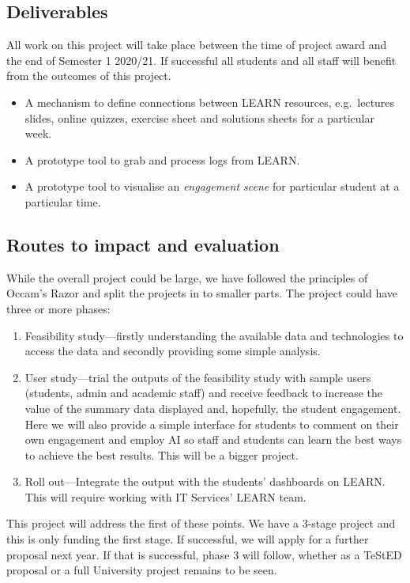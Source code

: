 \documentclass[11pt]{lucs-art}
\newcommand{\tested}{TeStED\xspace}
\begin{document}
\subsection{Deliverables}
All work on this project will take place between the time of project
award and the end of Semester 1 2020/21.  If successful all students
and all staff will benefit from the outcomes of this project.
\begin{itemize}
\item A mechanism to define connections between LEARN resources,
  e.g.\ lectures slides, online quizzes, exercise sheet and solutions
  sheets for a particular week.
\item A prototype tool to grab and process logs from LEARN.
\item A prototype tool to visualise an \emph{engagement scene} for
  particular student at a particular time.
\end{itemize}

\subsection{Routes to impact and evaluation}

While the overall project could be large, we have followed the
principles of Occam's Razor and split the projects in to smaller
parts.  The project could have three or more phases:
\begin{enumerate}
\item Feasibility study---firstly understanding the available data and
  technologies to access the data and secondly providing some simple
  analysis.
\item User study---trial the outputs of the feasibility study with
  sample users (students, admin and academic staff) and receive
  feedback to increase the value of the summary data displayed and,
  hopefully, the student engagement.  Here we will also provide a
  simple interface for students to comment on their own engagement
  and employ AI so staff and students can learn the best ways to
  achieve the best results.  This will be a bigger project.
\item Roll out---Integrate the output with the students' dashboards on LEARN\@.  This will require working with IT Services' LEARN team.
\end{enumerate}
This project will address the first of these points.  We have a 3-stage project and this is only funding the first stage.
If successful, we will apply for a further proposal next year.  If
that is successful, phase 3 will follow, whether as a \tested
proposal or a full University project remains to be seen.
\end{document}
